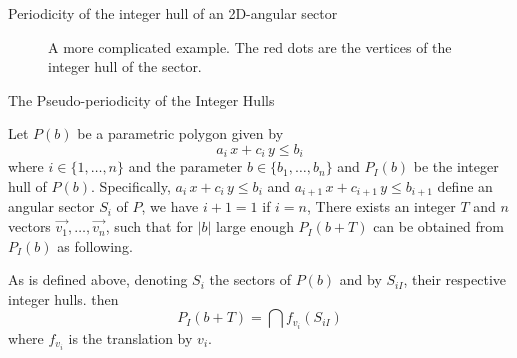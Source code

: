 \begin{frame}{Periodicity of the integer hull of an 2D-angular sector}
	\begin{block}{}
	\begin{figure}[H]
		\begin{subfigure}{.40\textwidth}
			\centering
			\caption{}
		\end{subfigure}
		\begin{subfigure}{.40\textwidth}
			\centering
			\caption{}
		\end{subfigure}
		\caption{A more complicated example. The red dots are the vertices of the integer hull of the sector.}
	\end{figure}	
	\end{block}
\end{frame}

\begin{frame}{The Pseudo-periodicity of the Integer Hulls}
	\begin{theorem}
		Let $P(b)$ be a parametric polygon given by 
		\begin{equation}  
			a_i\,x + c_i\,y \le b_i 
		\end{equation}
		where $i\in \{1,\ldots, n\}$ and the parameter $b \in \{b_1,\ldots, b_n\}$ and $P_I(b)$ be the integer hull of $P(b)$. Specifically, $a_i\,x + c_i\,y \le b_i$ and $a_{i+1}\,x + c_{i+1}\,y \le b_{i+1} $ define an angular sector $S_i$ of $P$, we have $i + 1 = 1$ if $i = n$,
		There exists an integer $T$ and $n$ vectors $\vec{v_1}, \ldots, \vec{v_n}$, 
		such that for $\lvert b\rvert $ large enough $P_I(b + T)$  can be obtained from $P_I(b)$ as
		following.
		
		As is defined above, denoting $S_i$ the sectors of $P(b)$ and by $S_{iI}$,
		their respective integer hulls. then
		\[P_I(b+T) = \bigcap f_{v_i}(S_{iI})\]
		where $f_{v_i}$ is the translation by $v_i$.
	\end{theorem}
\end{frame}

